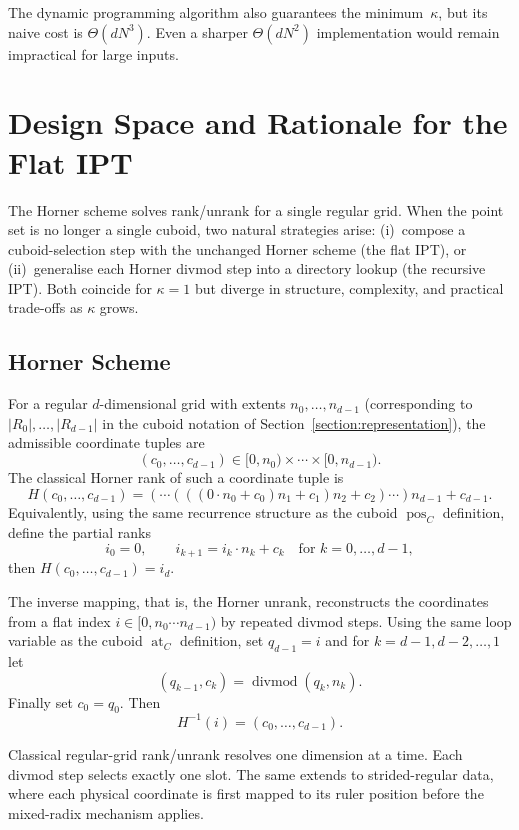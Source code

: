 \documentclass[manuscript,screen,review]{acmart}
\theoremstyle{definition}
\theoremstyle{plain}
\begin{document}
The dynamic programming algorithm also guarantees the minimum~$\kappa$, but its naive cost is $\Theta(dN^3)$. Even a sharper $\Theta(dN^2)$ implementation would remain impractical for large inputs.

\section{Design Space and Rationale for the Flat IPT}
\label{section:design-space}

The Horner scheme solves rank/unrank for a single regular grid.
When the point set is no longer a single cuboid, two natural strategies arise:
(i)~compose a cuboid-selection step with the unchanged Horner scheme
(the flat IPT), or
(ii)~generalise each Horner divmod step into a directory
lookup (the recursive IPT).
Both coincide for $\kappa=1$ but diverge
in structure, complexity, and practical trade-offs as
$\kappa$ grows.

\subsection{Horner Scheme}

For a regular $d$-dimensional grid with extents $n_0,\dots,n_{d-1}$ (corresponding to $|R_0|,\ldots,|R_{d-1}|$ in the cuboid notation of Section~\ref{section:representation}), the admissible coordinate tuples are
\[
  (c_0,\dots,c_{d-1}) \in [0,n_0) \times \cdots \times [0,n_{d-1}).
\]
The classical Horner rank of such a coordinate tuple is
\[
  H(c_0,\dots,c_{d-1})
  = (\cdots (((0 \cdot n_0 + c_0) n_1 + c_1)n_2 + c_2) \cdots ) n_{d-1} + c_{d-1}.
\]
Equivalently, using the same recurrence structure as the cuboid $\operatorname{pos}_C$ definition, define the partial ranks
\[
  i_0 = 0,
  \qquad
  i_{k+1} = i_k \cdot n_k + c_k
  \quad\text{for } k = 0,\ldots,d{-}1,
\]
then $H(c_0,\dots,c_{d-1}) = i_d$.

The inverse mapping, that is, the Horner unrank, reconstructs the coordinates from a flat index $i \in [0,n_0 \cdots n_{d-1})$ by repeated divmod steps. Using the same loop variable as the cuboid $\operatorname{at}_C$ definition, set $q_{d-1} = i$ and for $k=d{-}1,d{-}2,\dots,1$ let
\[
  (q_{k-1}, c_k) = \operatorname{divmod}(q_k, n_k).
\]
Finally set $c_0 = q_0$.
Then
\[
  H^{-1}(i) = (c_0,\dots,c_{d-1}).
\]

Classical regular-grid rank/unrank resolves one dimension at a time. Each divmod step selects exactly one slot. The same extends to strided-regular data, where each physical coordinate is first mapped to its ruler position before the mixed-radix mechanism applies.
\end{document}
